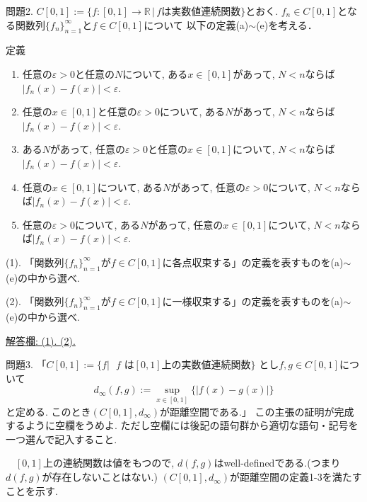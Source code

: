 \documentclass[dvipdfmx,a4paper,11pt]{article}
\newcommand{\R}{\mathbb{R}}
\theoremstyle{definition}
\begin{document}
問題2.
$C[0,1] := \{ f : [0,1] \rightarrow \R \,|\, \text{$f$は実数値連続関数}\}$とおく. $f_n \in C[0,1]$となる関数列$\{ f_{n}\}_{n=1}^{\infty}$と$f \in C[0,1]$について
以下の定義(a)$\sim$(e)を考える．
 \begin{itembox}[l]{定義}
\begin{enumerate}[label=(\alph*).]
 \setlength{\parskip}{0cm}
  \setlength{\itemsep}{0pt}
  \item 任意の$\varepsilon>0$と任意の$N$について, ある$x\in [0,1]$があって, $N<n$ならば$|f_{n}(x)-f(x)|<\varepsilon$.
 \item 任意の$x\in [0,1]$と任意の$\varepsilon>0$について, ある$N$があって, $N<n$ならば$|f_{n}(x)-f(x)|<\varepsilon$. 
 \item ある$N$があって, 任意の$\varepsilon>0$と任意の$x\in [0,1]$について, $N<n$ならば$|f_{n}(x)-f(x)|<\varepsilon$. 
 \item 任意の$x\in [0,1]$について, ある$N$があって, 任意の$\varepsilon>0$について, $N<n$ならば$|f_{n}(x)-f(x)|<\varepsilon$. 
 \item  任意の$\varepsilon>0$について, ある$N$があって, 任意の$x\in [0,1]$について, $N<n$ならば$|f_{n}(x)-f(x)|<\varepsilon$. 
\end{enumerate}
\end{itembox}

(1). 「関数列$\{ f_{n}\}_{n=1}^{\infty}$が$f \in C[0,1]$に各点収束する」の定義を表すものを(a)$\sim$(e)の中から選べ.

(2).  「関数列$\{ f_{n}\}_{n=1}^{\infty}$が$f \in C[0,1]$に一様収束する」の定義を表すものを(a)$\sim$(e)の中から選べ.

\medskip
\underline{解答欄: (1).\hspace{2cm} (2).\hspace{2cm}}

\medskip
問題3. 「$C[0,1]:= \{f | \text{ $f$ は$[0,1]$上の実数値連続関数} \}$
とし$f,g \in C[0,1]$について
$$
d_{\infty}(f,g) := \sup_{x \in [0,1]} \{ |f(x) - g(x)|\}
$$
と定める.  
このとき$(C[0,1],d_{\infty})$が距離空間である.」
この主張の証明が完成するように空欄をうめよ. ただし空欄には後記の語句群から適切な語句・記号を一つ選んで記入すること.

\medskip
 [証明.]　$[0,1]$上の連続関数は\boxed{\phantom{hogehoge}}値をもつので, $d(f,g)$はwell-definedである.(つまり$d(f,g)$が存在しないことはない.)
 $(C[0,1],d_{\infty})$が距離空間の定義1-3を満たすことを示す. 
\end{document}
